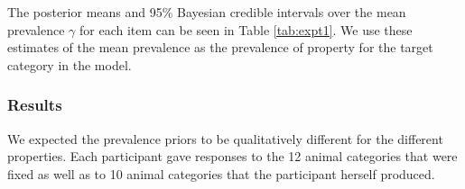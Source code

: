 \documentclass[10pt,letterpaper]{article}
\begin{document}
The posterior means and 95\% Bayesian credible intervals over the mean prevalence $\gamma$ for each item can be seen in Table \ref{tab:expt1}. 
We use these estimates of the mean prevalence as the prevalence of property for the target category in the model. 


\subsubsection{Results}

We expected the prevalence priors to be qualitatively different for the different properties. 
Each participant gave responses to the 12 animal categories that were fixed as well as to 10 animal categories that the participant herself produced. 
\end{document}
